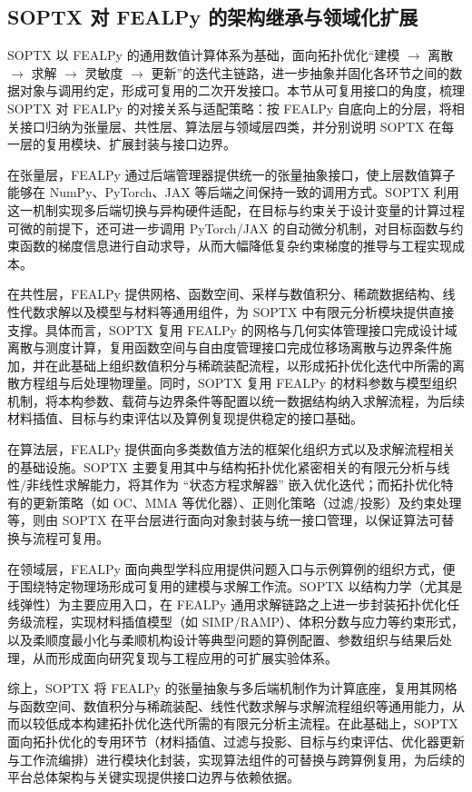 \subsection{SOPTX 对 FEALPy 的架构继承与领域化扩展}
\label{subsec:fealpy_resue}

SOPTX 以 FEALPy 的通用数值计算体系为基础，面向拓扑优化“建模 $\rightarrow$ 离散  $\rightarrow$ 求解  $\rightarrow$ 灵敏度  $\rightarrow$ 更新”的迭代主链路，进一步抽象并固化各环节之间的数据对象与调用约定，形成可复用的二次开发接口。本节从可复用接口的角度，梳理 SOPTX 对 FEALPy 的对接关系与适配策略：按 FEALPy 自底向上的分层，将相关接口归纳为张量层、共性层、算法层与领域层四类，并分别说明 SOPTX 在每一层的复用模块、扩展封装与接口边界。

在张量层，FEALPy 通过后端管理器提供统一的张量抽象接口，使上层数值算子能够在 NumPy、PyTorch、JAX 等后端之间保持一致的调用方式。SOPTX 利用这一机制实现多后端切换与异构硬件适配，在目标与约束关于设计变量的计算过程可微的前提下，还可进一步调用 PyTorch/JAX 的自动微分机制，对目标函数与约束函数的梯度信息进行自动求导，从而大幅降低复杂约束梯度的推导与工程实现成本。

在共性层，FEALPy 提供网格、函数空间、采样与数值积分、稀疏数据结构、线性代数求解以及模型与材料等通用组件，为 SOPTX 中有限元分析模块提供直接支撑。具体而言，SOPTX 复用 FEALPy 的网格与几何实体管理接口完成设计域离散与测度计算，复用函数空间与自由度管理接口完成位移场离散与边界条件施加，并在此基础上组织数值积分与稀疏装配流程，以形成拓扑优化迭代中所需的离散方程组与后处理物理量。同时，SOPTX 复用 FEALPy 的材料参数与模型组织机制，将本构参数、载荷与边界条件等配置以统一数据结构纳入求解流程，为后续材料插值、目标与约束评估以及算例复现提供稳定的接口基础。

在算法层，FEALPy 提供面向多类数值方法的框架化组织方式以及求解流程相关的基础设施。SOPTX 主要复用其中与结构拓扑优化紧密相关的有限元分析与线性/非线性求解能力，将其作为 “状态方程求解器” 嵌入优化迭代；而拓扑优化特有的更新策略（如 OC、MMA 等优化器）、正则化策略（过滤/投影）及约束处理等，则由 SOPTX 在平台层进行面向对象封装与统一接口管理，以保证算法可替换与流程可复用。

在领域层，FEALPy 面向典型学科应用提供问题入口与示例算例的组织方式，便于围绕特定物理场形成可复用的建模与求解工作流。SOPTX 以结构力学（尤其是线弹性）为主要应用入口，在 FEALPy 通用求解链路之上进一步封装拓扑优化任务级流程，实现材料插值模型（如 SIMP/RAMP）、体积分数与应力等约束形式，以及柔顺度最小化与柔顺机构设计等典型问题的算例配置、参数组织与结果后处理，从而形成面向研究复现与工程应用的可扩展实验体系。

综上，SOPTX 将 FEALPy 的张量抽象与多后端机制作为计算底座，复用其网格与函数空间、数值积分与稀疏装配、线性代数求解与求解流程组织等通用能力，从而以较低成本构建拓扑优化迭代所需的有限元分析主流程。在此基础上，SOPTX 面向拓扑优化的专用环节（材料插值、过滤与投影、目标与约束评估、优化器更新与工作流编排）进行模块化封装，实现算法组件的可替换与跨算例复用，为后续的平台总体架构与关键实现提供接口边界与依赖依据。


